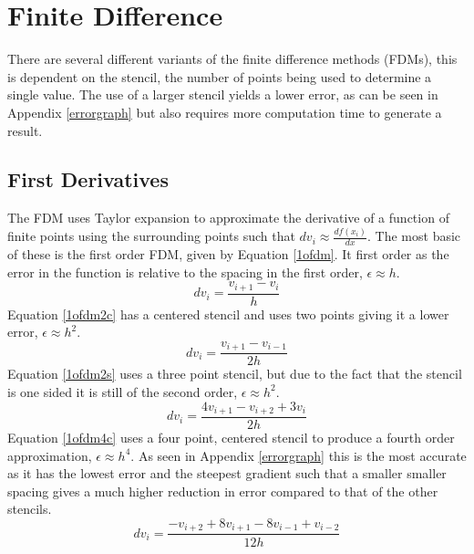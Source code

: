 \chapter{Finite Difference}
There are several different variants of the  finite difference methods (FDMs), this is dependent on the stencil, the number of points being used to determine a single value. The use of a larger stencil yields a lower error, as can be seen in Appendix \ref{errorgraph} but also requires more computation time to generate a result.
\section{First Derivatives}
The FDM uses Taylor expansion to approximate the derivative of a function of finite points using the surrounding points such that $dv_i \approx \frac{df(x_i)}{dx}$.
\linebreak
\linebreak
The most basic of these is the first order FDM, given by Equation \ref{1ofdm}. It first order as the error in the function is relative to the spacing in the first order, $\epsilon \approx h$.
\begin{equation} \label{1ofdm}
  dv_i = \frac{v_{i+1} - v_i}{h}
\end{equation}
Equation \ref{1ofdm2c} has a centered stencil and uses two points giving it a lower error, $\epsilon \approx h^2$.
\begin{equation} \label{1ofdm2c}
  dv_i = \frac{v_{i+1} - v_{i-1}}{2h}
\end{equation}
Equation \ref{1ofdm2s} uses a three point stencil, but due to the fact that the stencil is one sided it is still of the second order, $\epsilon \approx h^2$.
\begin{equation} \label{1ofdm2s}
  dv_i = \frac{4v_{i+1} - v_{i+2} + 3v_i}{2h}
\end{equation}
Equation \ref{1ofdm4c} uses a four point, centered stencil to produce a fourth order approximation, $\epsilon \approx h^4$. As seen in Appendix \ref{errorgraph} this is the most accurate as it has the lowest error and the steepest gradient such that a smaller smaller spacing gives a much higher reduction in error compared to that of the other stencils.
\begin{equation} \label{1ofdm4c}
  dv_i = \frac{-v_{i+2} + 8v_{i+1} - 8v_{i-1} + v_{i-2}}{12h}
\end{equation}

